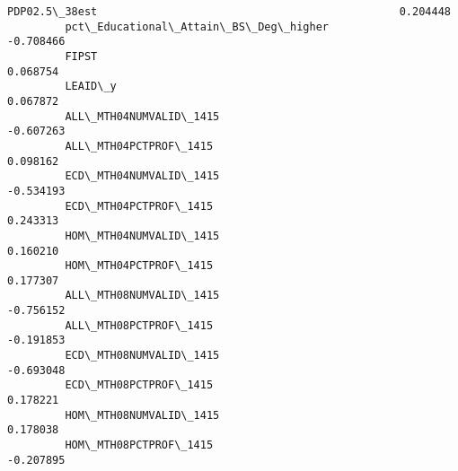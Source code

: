 \documentclass[11pt]{article}
\begin{document}
\begin{Verbatim}[commandchars=\\\{\}]
         PDP02.5\_38est                                               0.204448   
         pct\_Educational\_Attain\_BS\_Deg\_higher                       -0.708466   
         FIPST                                                       0.068754   
         LEAID\_y                                                     0.067872   
         ALL\_MTH04NUMVALID\_1415                                     -0.607263   
         ALL\_MTH04PCTPROF\_1415                                       0.098162   
         ECD\_MTH04NUMVALID\_1415                                     -0.534193   
         ECD\_MTH04PCTPROF\_1415                                       0.243313   
         HOM\_MTH04NUMVALID\_1415                                      0.160210   
         HOM\_MTH04PCTPROF\_1415                                       0.177307   
         ALL\_MTH08NUMVALID\_1415                                     -0.756152   
         ALL\_MTH08PCTPROF\_1415                                      -0.191853   
         ECD\_MTH08NUMVALID\_1415                                     -0.693048   
         ECD\_MTH08PCTPROF\_1415                                       0.178221   
         HOM\_MTH08NUMVALID\_1415                                      0.178038   
         HOM\_MTH08PCTPROF\_1415                                      -0.207895   
         

\end{Verbatim}
\end{document}
